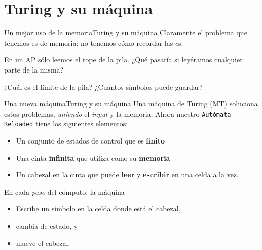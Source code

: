 \documentclass[spanish, handout]{beamer}
\begin{document}
\section{Turing y su máquina}

\begin{frame}{Un mejor uso de la memoria}{Turing y su máquina}
    Claramente el problema que tenemos es de memoria: no tenemos cómo recordar las $c$s. \pause

    \bigskip

    En un AP sólo leemos el tope de la pila. ¿Qué pasaría si leyéramos cualquier parte de la misma? \pause

    \bigskip

    ¿Cuál es el límite de la pila? ¿Cuántos símbolos puede guardar?
\end{frame}

\begin{frame}{Una nueva máquina}{Turing y su máquina}
     Una \alert{máquina de Turing} (MT) soluciona estos problemas, \textit{uniendo} el \textit{input} y la memoria. Ahora nuestro \texttt{Autómata Reloaded} tiene los siguientes elementos: \pause

     \begin{itemize}
        \itemsep1.5ex
        \item Un \alert{conjunto de estados de control} que es \textbf{finito} \pause
        \item Una \alert{cinta} \textbf{infinita} que utiliza como su \textbf{memoria} \pause
        \item Un \alert{cabezal en la cinta} que puede \textbf{leer} y \textbf{escribir} en una celda a la vez. \pause
     \end{itemize}

     En cada \textit{paso} del cómputo, la máquina \pause
     \begin{itemize}
         \itemsep1.5ex
         \item Escribe un símbolo en la celda donde está el cabezal, \pause
         \item cambia de estado, y \pause
         \item mueve el cabezal.
     \end{itemize}
\end{frame}
\end{document}

